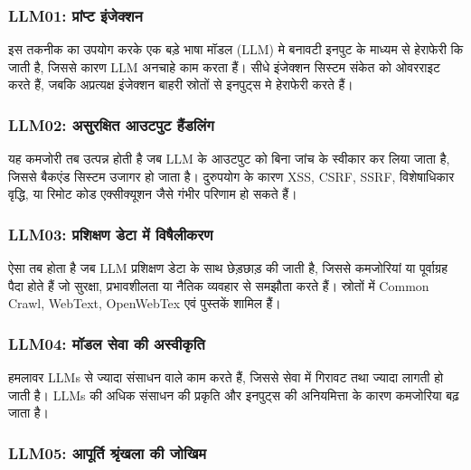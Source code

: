\documentclass[
]{article}
\begin{document}
\subsubsection{LLM01: प्रांप्ट
इंजेक्शन}\label{llm01-ux92aux930ux92aux91f-ux907ux91cux915ux936ux928}

इस तकनीक का उपयोग करके एक बड़े भाषा मॉडल (LLM) मे बनावटी इनपुट के माध्यम से
हेराफेरी कि जाती है, जिससे कारण LLM अनचाहे काम करता हैं। सीधे इंजेक्शन सिस्टम संकेत को
ओवरराइट करते हैं, जबकि अप्रत्यक्ष इंजेक्शन बाहरी स्रोतों से इनपुट्स मे हेराफेरी करते हैं।

\subsubsection{LLM02: असुरक्षित आउटपुट
हैंडलिंग}\label{llm02-ux905ux938ux930ux915ux937ux924-ux906ux909ux91fux92aux91f-ux939ux921ux932ux917}

यह कमजोरी तब उत्पन्न होती है जब LLM के आउटपुट को बिना जांच के स्वीकार कर लिया
जाता है, जिससे बैकएंड सिस्टम उजागर हो जाता है। दुरुपयोग के कारण XSS, CSRF, SSRF,
विशेषाधिकार वृद्धि, या रिमोट कोड एक्सीक्यूशन जैसे गंभीर परिणाम हो सकते हैं।

\subsubsection{LLM03: प्रशिक्षण डेटा में
विषैलीकरण}\label{llm03-ux92aux930ux936ux915ux937ux923-ux921ux91f-ux92e-ux935ux937ux932ux915ux930ux923}

ऐसा तब होता है जब LLM प्रशिक्षण डेटा के साथ छेड़छाड़ की जाती है, जिससे कमजोरियां या
पूर्वाग्रह पैदा होते हैं जो सुरक्षा, प्रभावशीलता या नैतिक व्यवहार से समझौता करते हैं।
स्रोतों में Common Crawl, WebText, OpenWebTex एवं पुस्तकें शामिल हैं।

\subsubsection{LLM04: मॉडल सेवा की
अस्वीकृति}\label{llm04-ux92eux921ux932-ux938ux935-ux915-ux905ux938ux935ux915ux924}

हमलावर LLMs से ज्यादा संसाधन वाले काम करते हैं, जिससे सेवा में गिरावट तथा ज्यादा
लागती हो जाती है। LLMs की अधिक संसाधन की प्रकृति और इनपुट्स की अनियमित्ता के
कारण कमजोरिया बढ़ जाता है।

\subsubsection{LLM05: आपूर्ति श्रृंखला की
जोखिम}\label{llm05-ux906ux92aux930ux924-ux936ux930ux916ux932-ux915-ux91cux916ux92e}
\end{document}
